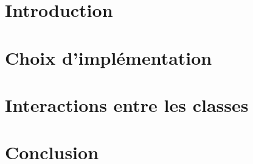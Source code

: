\documentclass[a4paper, 12pt]{article}
\begin{document}
	


	\tableofcontents
	\newpage	

	\section{Introduction}
	
	\newpage

	\section{Choix d'implémentation}
	
	\newpage
	
	\section{Interactions entre les classes}
	
	\newpage

	\section{Conclusion}
	
	
	
\end{document}
